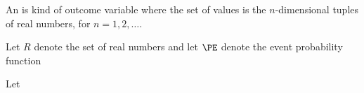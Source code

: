 


An  is kind
of outcome variable where the set
of values is the $n$-dimensional
tuples of real numbers, for
$n = 1, 2, \dots$.


Let $R$ denote the set of
real numbers and let $\PE$
denote the event probability
function

Let


